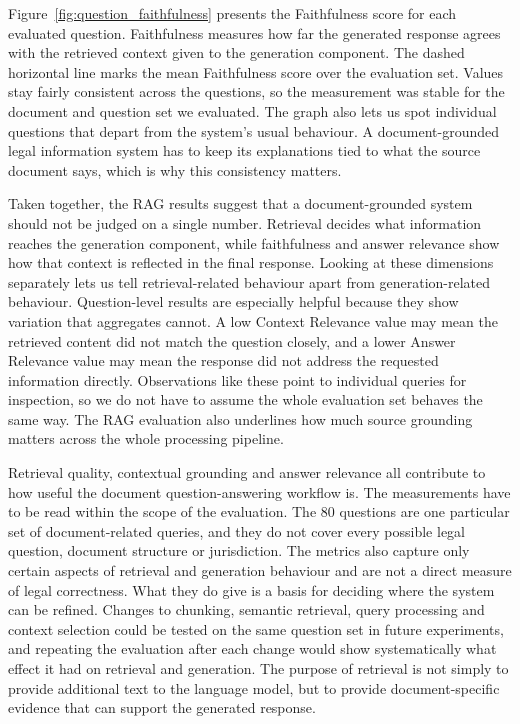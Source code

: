 \documentclass[12pt,a4paper,oneside]{report}
\begin{document}
Figure~\ref{fig:question_faithfulness} presents the Faithfulness score for each evaluated question. Faithfulness measures how far the generated response agrees with the retrieved context given to the generation component. The dashed horizontal line marks the mean Faithfulness score over the evaluation set. Values stay fairly consistent across the questions, so the measurement was stable for the document and question set we evaluated. The graph also lets us spot individual questions that depart from the system's usual behaviour. A document-grounded legal information system has to keep its explanations tied to what the source document says, which is why this consistency matters.

Taken together, the RAG results suggest that a document-grounded system should not be judged on a single number. Retrieval decides what information reaches the generation component, while faithfulness and answer relevance show how that context is reflected in the final response. Looking at these dimensions separately lets us tell retrieval-related behaviour apart from generation-related behaviour. Question-level results are especially helpful because they show variation that aggregates cannot. A low Context Relevance value may mean the retrieved content did not match the question closely, and a lower Answer Relevance value may mean the response did not address the requested information directly. Observations like these point to individual queries for inspection, so we do not have to assume the whole evaluation set behaves the same way. The RAG evaluation also underlines how much source grounding matters across the whole processing pipeline.

Retrieval quality, contextual grounding and answer relevance all contribute to how useful the document question-answering workflow is. The measurements have to be read within the scope of the evaluation. The 80 questions are one particular set of document-related queries, and they do not cover every possible legal question, document structure or jurisdiction. The metrics also capture only certain aspects of retrieval and generation behaviour and are not a direct measure of legal correctness. What they do give is a basis for deciding where the system can be refined. Changes to chunking, semantic retrieval, query processing and context selection could be tested on the same question set in future experiments, and repeating the evaluation after each change would show systematically what effect it had on retrieval and generation. The purpose of retrieval is not simply to provide additional text to the language model, but to provide document-specific evidence that can support the generated response. 
\end{document}
